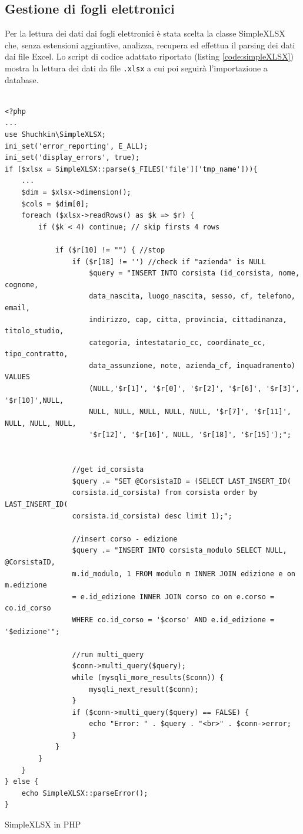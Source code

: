 \subsection{Gestione di fogli elettronici}
\label{sec:excel}
Per la lettura dei dati dai fogli elettronici è stata scelta la classe SimpleXLSX \cite{simpleXLSX} che, senza estensioni aggiuntive, analizza, recupera ed effettua il parsing dei dati dai file Excel. Lo script di codice adattato riportato (listing \ref{code:simpleXLSX}) mostra la lettura dei dati da file \verb|.xlsx| a cui poi seguirà l'importazione a database.
\begin{listing}[!hbt]
\begin{verbatim}

<?php 
...
use Shuchkin\SimpleXLSX;
ini_set('error_reporting', E_ALL);
ini_set('display_errors', true);
if ($xlsx = SimpleXLSX::parse($_FILES['file']['tmp_name'])){
    ...
    $dim = $xlsx->dimension();
    $cols = $dim[0];
    foreach ($xlsx->readRows() as $k => $r) {
        if ($k < 4) continue; // skip firsts 4 rows

            if ($r[10] != "") { //stop
                if ($r[18] != '') //check if "azienda" is NULL
                    $query = "INSERT INTO corsista (id_corsista, nome, cognome,
                    data_nascita, luogo_nascita, sesso, cf, telefono, email,
                    indirizzo, cap, citta, provincia, cittadinanza, titolo_studio,
                    categoria, intestatario_cc, coordinate_cc, tipo_contratto,
                    data_assunzione, note, azienda_cf, inquadramento) VALUES 
                    (NULL,'$r[1]', '$r[0]', '$r[2]', '$r[6]', '$r[3]', '$r[10]',NULL,
                    NULL, NULL, NULL, NULL, NULL, '$r[7]', '$r[11]', NULL, NULL, NULL,
                    '$r[12]', '$r[16]', NULL, '$r[18]', '$r[15]');";


                //get id_corsista
                $query .= "SET @CorsistaID = (SELECT LAST_INSERT_ID(
                corsista.id_corsista) from corsista order by LAST_INSERT_ID(
                corsista.id_corsista) desc limit 1);";

                //insert corso - edizione
                $query .= "INSERT INTO corsista_modulo SELECT NULL, @CorsistaID,
                m.id_modulo, 1 FROM modulo m INNER JOIN edizione e on m.edizione
                = e.id_edizione INNER JOIN corso co on e.corso = co.id_corso 
                WHERE co.id_corso = '$corso' AND e.id_edizione = '$edizione'";

                //run multi_query
                $conn->multi_query($query);
                while (mysqli_more_results($conn)) {
                    mysqli_next_result($conn);
                }
                if ($conn->multi_query($query) == FALSE) {
                    echo "Error: " . $query . "<br>" . $conn->error;
                }
            }
        }
    }
} else {
    echo SimpleXLSX::parseError();
}
\end{verbatim}
\caption{SimpleXLSX in PHP}
\label{code:simpleXLSX}
\end{listing}
